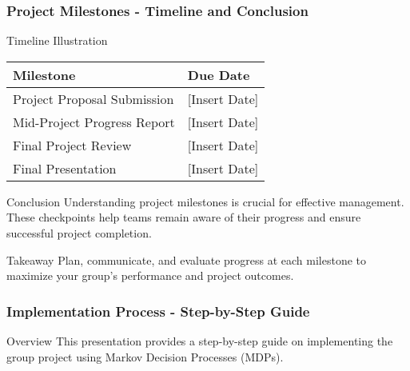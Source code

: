 \documentclass{beamer}
\begin{document}
\begin{frame}[fragile]
    \frametitle{Project Milestones - Timeline and Conclusion}
    \begin{block}{Timeline Illustration}
    \begin{center}
    \begin{tabular}{|l|l|}
    \hline
    \textbf{Milestone} & \textbf{Due Date} \\
    \hline
    Project Proposal Submission & [Insert Date] \\
    Mid-Project Progress Report & [Insert Date] \\
    Final Project Review & [Insert Date] \\
    Final Presentation & [Insert Date] \\
    \hline
    \end{tabular}
    \end{center}
    \end{block}

    \begin{block}{Conclusion}
        Understanding project milestones is crucial for effective management. These checkpoints help teams remain aware of their progress and ensure successful project completion.
    \end{block}
    
    \begin{block}{Takeaway}
        Plan, communicate, and evaluate progress at each milestone to maximize your group’s performance and project outcomes.
    \end{block}
\end{frame}

\begin{frame}[fragile]
    \frametitle{Implementation Process - Step-by-Step Guide}

    \begin{block}{Overview}
        This presentation provides a step-by-step guide on implementing the group project using Markov Decision Processes (MDPs).
    \end{block}
\end{frame}
\end{document}
